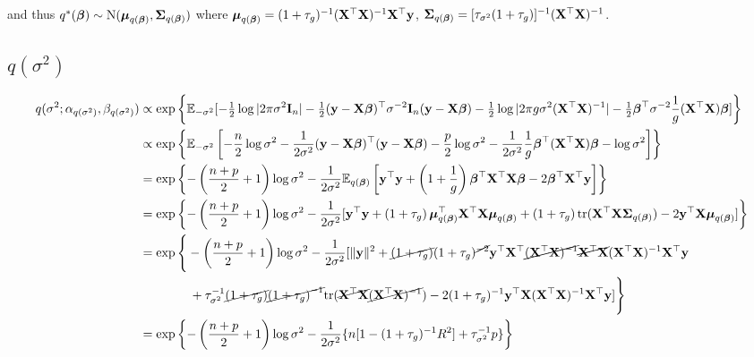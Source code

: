 \documentclass{amsart}[12pt]
\begin{document}
and thus
$q^*({\boldsymbol \beta}) \sim \text{N} ({\boldsymbol \mu}_{q({\boldsymbol \beta})}, {\boldsymbol \Sigma}_{q({\boldsymbol \beta})} )$
where ${\boldsymbol \mu}_{q({\boldsymbol \beta})} = (1 + \tau_g)^{-1} ({\bf X}^\top {\bf X})^{-1} {\bf X}^\top {\bf y}$,
${\boldsymbol \Sigma}_{q({\boldsymbol \beta})} = [\tau_{\sigma^2}(1 + \tau_{g})]^{-1}({\bf X}^\top {\bf X})^{-1}$.

\small
\subsection{$q(\sigma^2)$}
\begin{align*}
	q(\sigma^2; \alpha_{q(\sigma^2)}, \beta_{q(\sigma^2)}) & \propto \exp \left \{ \mathbb{E}_{-\sigma^2} [-\tfrac{1}{2} \log |2 \pi \sigma^2 {\bf I}_n| - \tfrac{1}{2} ({\bf y} - {\bf X} {\boldsymbol \beta})^\top \sigma^{-2} {\bf I}_n ({\bf y} - {\bf X} {\boldsymbol \beta}) - \tfrac{1}{2} \log |2 \pi g \sigma^2 ({\bf X}^\top {\bf X})^{-1}| - \tfrac{1}{2} {\boldsymbol \beta}^\top \sigma^{-2} \frac{1}{g} ({\bf X}^\top {\bf X}) {\boldsymbol \beta}] \right \}                        \\
	                                                       & \propto  \exp \left \{ \mathbb{E}_{-\sigma^2} \left[- \frac{n}{2} \log \sigma^2 - \frac{1}{2 \sigma^2}({\bf y} - {\bf X} {\boldsymbol \beta})^\top({\bf y} - {\bf X} {\boldsymbol \beta}) - \frac{p}{2} \log \sigma^2 - \frac{1}{2 \sigma^2} \frac{1}{g} {\boldsymbol \beta}^\top ({\bf X}^\top {\bf X}) {\boldsymbol \beta} - \log \sigma^2\right] \right \}                             \\
	                                                       & =  \exp \left \{ {-\left(\frac{n + p}{2} + 1\right) \log \sigma^2 - \frac{1}{2 \sigma^2} \mathbb{E}_{q({\boldsymbol \beta})} \left[ {\bf y}^\top {\bf y} + \left(1 + \frac{1}{g} \right) {\boldsymbol \beta}^\top {\bf X}^\top {\bf X} {\boldsymbol\beta} - 2 {\boldsymbol \beta}^\top {\bf X}^\top {\bf y} \right]}  \right \}                                                          \\
	                                                       & =  \exp \left \{ -\left(\frac{n + p}{2} + 1 \right)\log \sigma^2  - \frac{1}{2 \sigma^2} [{\bf y}^\top{\bf y} + \left( 1 + \tau_g \right) {\boldsymbol \mu}_{q({\boldsymbol \beta})}^\top {\bf X}^\top {\bf X} {\boldsymbol\mu}_{q({\boldsymbol \beta})} + \left( 1 + \tau_g \right) \text{tr}({\bf X}^\top {\bf X} {\boldsymbol\Sigma}_{q({\boldsymbol \beta})}) - 2 {\bf y}^\top {\bf X} {\boldsymbol\mu}_{q({\boldsymbol \beta})} ] \right \} \\
	                                                       & =  \exp \Bigg \{ -\left(\frac{n + p}{2} + 1 \right)\log \sigma^2  - \frac{1}{2 \sigma^2} [\|{\bf y}\|^2 + \cancel{\left( 1 + \tau_g \right)} (1 + \tau_g)^{\cancel{-2}} {\bf y}^\top {\bf X}^\top \cancel{({\bf X}^\top {\bf X})^{-1}} \cancel{{\bf X}^\top {\bf X}} ({\bf X}^\top {\bf X})^{-1} {\bf X}^\top {\bf y}                             \\
	                                                       & \quad \quad \quad \quad + \tau_{\sigma^2}^{-1} \cancel{\left( 1 + \tau_g \right)} \cancel{\left( 1 + \tau_g \right)^{-1}} \text{tr}(\cancel{{\bf X}^\top {\bf X}} \cancel{({\bf X}^\top {\bf X})^{-1}}) - 2 (1 + \tau_g)^{-1} {\bf y}^\top {\bf X} ({\bf X}^\top {\bf X})^{-1} {\bf X}^\top {\bf y} ] \Bigg \}                                      \\
	                                                       & = \exp \left \{ -\left(\frac{n + p}{2} + 1 \right)\log \sigma^2 - \frac{1}{2 \sigma^2} \{n[1 - (1 + \tau_g)^{-1}  R^2] + \tau_{\sigma^2}^{-1} p \} \right \}                                                                                                                                          
\end{align*}
\end{document}
